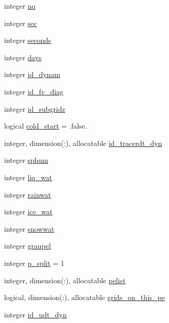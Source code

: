 \begin{DoxyCompactItemize}
integer \hyperlink{classatmosphere__mod_ab5e69a4d3670d2800a288b1c49ad3d9a}{nq}
\item 
integer \hyperlink{classatmosphere__mod_abe192872a4a5b42159d0c2251ac9cb14}{sec}
\item 
integer \hyperlink{classatmosphere__mod_aafb92c94f8850295ad027e0538ae78ca}{seconds}
\item 
integer \hyperlink{classatmosphere__mod_a110bc10bed586ca2cddc28ac924959a7}{days}
\item 
integer \hyperlink{classatmosphere__mod_ac1b450b5b014a927fb0456a5b8e73710}{id\-\_\-dynam}
\item 
integer \hyperlink{classatmosphere__mod_a6d434f016963346507b32a22b7f41440}{id\-\_\-fv\-\_\-diag}
\item 
integer \hyperlink{classatmosphere__mod_af368e346f77c2d615969072223e3edad}{id\-\_\-subgridz}
\item 
logical \hyperlink{classatmosphere__mod_a6f65980184c149309238cf3926145607}{cold\-\_\-start} = .false.
\item 
integer, dimension(\-:), allocatable \hyperlink{classatmosphere__mod_ae021e6f5700c65ee41c520e77e44712d}{id\-\_\-tracerdt\-\_\-dyn}
\item 
integer \hyperlink{classatmosphere__mod_a794b092a72b516a3078dbff077136a08}{sphum}
\item 
integer \hyperlink{classatmosphere__mod_a41f34859d8c8fd6e84cd71aabd6d2a25}{liq\-\_\-wat}
\item 
integer \hyperlink{classatmosphere__mod_ad9345d06c2a877903e3bfdfb529a2a63}{rainwat}
\item 
integer \hyperlink{classatmosphere__mod_a9d5b133b6c0010773c3f475af7e879fc}{ice\-\_\-wat}
\item 
integer \hyperlink{classatmosphere__mod_a638b8d7ecc568cfe3706105b9db0affe}{snowwat}
\item 
integer \hyperlink{classatmosphere__mod_a6af183d451e4d59e5cd97150b69e9ec7}{graupel}
\item 
integer \hyperlink{classatmosphere__mod_a95ee36e402cdda22fbff7a5e5a698d2d}{p\-\_\-split} = 1
\item 
integer, dimension(\-:), allocatable \hyperlink{classatmosphere__mod_a40b6e75a5e8c4bafc747edc08eceaed5}{pelist}
\item 
logical, dimension(\-:), allocatable \hyperlink{classatmosphere__mod_ad80223528e58b40110f8a1ffdd3b9aad}{grids\-\_\-on\-\_\-this\-\_\-pe}
\item 
integer \hyperlink{classatmosphere__mod_a0c326e48546ef823bdc928ba03bac964}{id\-\_\-udt\-\_\-dyn}

\end{DoxyCompactItemize}
